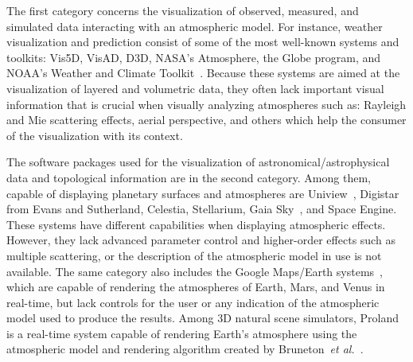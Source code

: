 \documentclass[journal]{vgtc}                %
\newcommand{\etal}{\emph{et al.}}
\newcommand{\review}[1]{{\color{blue}#1}}
\begin{document}
The first category concerns the visualization of observed, measured, and simulated data interacting with an atmospheric model. For instance, weather visualization and prediction consist of some of the most well-known systems and toolkits: Vis5D, VisAD, D3D, NASA's Atmosphere, the Globe program, and NOAA's Weather and Climate Toolkit~\cite{NOAAWeatherClimate}. Because these systems are aimed at the visualization of layered and volumetric data, they often lack important visual information that is crucial when visually analyzing atmospheres such as: Rayleigh and Mie scattering effects, aerial perspective, and others which help the consumer of the visualization with its context.

The software packages used for the visualization of astronomical/astrophysical data and topological information are in the second category. Among them, capable of displaying planetary surfaces and atmospheres are Uniview~\cite{klashed10uniview}, Digistar from Evans and Sutherland, Celestia, Stellarium, Gaia Sky~\cite{GaiaSky2018}, and Space Engine. These systems have different capabilities when displaying atmospheric effects. However, they lack advanced parameter control and higher-order effects such as multiple scattering, or the description of the atmospheric model in use is not available. The same category also includes the Google Maps/Earth systems~\cite{GoogleEarth:2017}, which are capable of rendering the atmospheres of Earth, Mars, and Venus in real-time, but lack controls for the user or any indication of the atmospheric model used to produce the results. Among 3D natural scene simulators, Proland is a real-time system capable of rendering Earth's atmosphere using the atmospheric model and rendering algorithm created by Bruneton~\etal~\cite{BrunetonNeyret:2008}.


\end{document}
